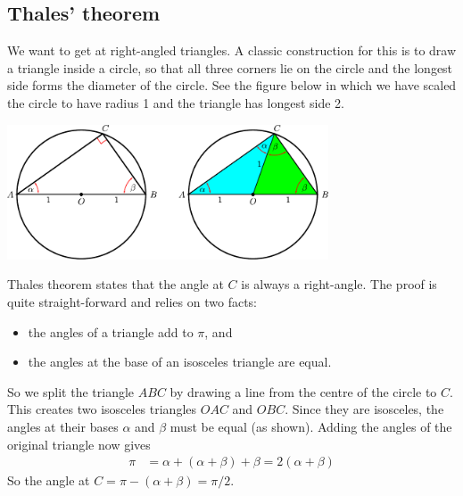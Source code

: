 \subsection{Thales' theorem}
We want to get at right-angled triangles. A classic construction for this is to
draw a triangle inside a circle, so that all three corners lie on the circle
and the longest side forms the diameter of the circle. See the figure below in
which we have scaled the circle to have radius 1 and the triangle has longest
side 2.

\begin{center}
  \includegraphics[height=4cm]{thales}
\end{center}

Thales theorem states that the angle at $C$ is always a right-angle. The proof
is quite straight-forward and relies on two facts:
\begin{itemize}
 \item the angles of a triangle add to $\pi$, and
 \item the angles at the base of an isosceles triangle are equal.
\end{itemize}
So we split the triangle $ABC$ by drawing a line from the centre of the circle to $C$. This creates two isosceles triangles $OAC$ and $OBC$. Since they are isosceles, the angles at their bases $\alpha$ and $\beta$ must be equal (as shown).  Adding the angles of the original triangle now gives
\begin{align*}
  \pi &= \alpha + (\alpha+\beta) + \beta = 2(\alpha+\beta)
\end{align*}
So the angle at $C = \pi - (\alpha+\beta) = \pi/2$.


